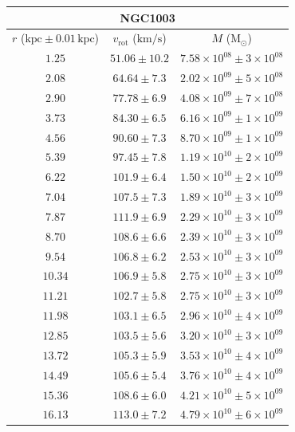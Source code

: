 \documentclass{article}
\newcommand\solmass{\textrm{M}_\odot}
\newcommand\kpc{\textrm{kpc}}
\newcommand\kmps{\textrm{km}/\textrm{s}}
\newcommand\vrot{\ensuremath{v_{\textrm{rot}}}}
\begin{document}
\singlespacing
\begin{table}[h!]
    \begin{tabular}{|c|c|c|}
        \hline
        \multicolumn{3}{|c|}{NGC1003} \\
        \hline
        $r$ ($\kpc \pm 0.01 \,\kpc$) & $\vrot$ ($\kmps$) & $M$ ($\solmass$) \\
        \hline
        $1.25$ & $51.06 \pm 10.2$ & $7.58\times 10^{08} \pm 3\times 10^{08}$ \\
        $2.08$ & $64.64 \pm 7.3$ & $2.02\times 10^{09} \pm 5\times 10^{08}$ \\
        $2.90$ & $77.78 \pm 6.9$ & $4.08\times 10^{09} \pm 7\times 10^{08}$ \\
        $3.73$ & $84.30 \pm 6.5$ & $6.16\times 10^{09} \pm 1\times 10^{09}$ \\
        $4.56$ & $90.60 \pm 7.3$ & $8.70\times 10^{09} \pm 1\times 10^{09}$ \\
        $5.39$ & $97.45 \pm 7.8$ & $1.19\times 10^{10} \pm 2\times 10^{09}$ \\
        $6.22$ & $101.9 \pm 6.4$ & $1.50\times 10^{10} \pm 2\times 10^{09}$ \\
        $7.04$ & $107.5 \pm 7.3$ & $1.89\times 10^{10} \pm 3\times 10^{09}$ \\
        $7.87$ & $111.9 \pm 6.9$ & $2.29\times 10^{10} \pm 3\times 10^{09}$ \\
        $8.70$ & $108.6 \pm 6.6$ & $2.39\times 10^{10} \pm 3\times 10^{09}$ \\
        $9.54$ & $106.8 \pm 6.2$ & $2.53\times 10^{10} \pm 3\times 10^{09}$ \\
        $10.34$ & $106.9 \pm 5.8$ & $2.75\times 10^{10} \pm 3\times 10^{09}$ \\
        $11.21$ & $102.7 \pm 5.8$ & $2.75\times 10^{10} \pm 3\times 10^{09}$ \\
        $11.98$ & $103.1 \pm 6.5$ & $2.96\times 10^{10} \pm 4\times 10^{09}$ \\
        $12.85$ & $103.5 \pm 5.6$ & $3.20\times 10^{10} \pm 3\times 10^{09}$ \\
        $13.72$ & $105.3 \pm 5.9$ & $3.53\times 10^{10} \pm 4\times 10^{09}$ \\
        $14.49$ & $105.6 \pm 5.4$ & $3.76\times 10^{10} \pm 4\times 10^{09}$ \\
        $15.36$ & $108.6 \pm 6.0$ & $4.21\times 10^{10} \pm 5\times 10^{09}$ \\
        $16.13$ & $113.0 \pm 7.2$ & $4.79\times 10^{10} \pm 6\times 10^{09}$ \\

\end{tabular}
\end{table}
\end{document}
